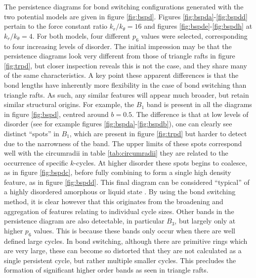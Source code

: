 The persistence diagrams for bond switching configurations generated with the two potential models are given in figure \ref{fig:bspd}.
Figures \ref{fig:bspda}\--\ref{fig:bspdd} pertain to the force constant ratio $k_r/k_\theta=16$ and figures \ref{fig:bspde}\--\ref{fig:bspdh} at $k_r/k_\theta=4$.
For both models, four different $p_6$ values were selected, corresponding to four increasing levels of disorder.
The initial impression may be that the persistence diagrams look very different from those of triangle rafts in figure \ref{fig:trpd}, but closer inspection reveals this is not the case, and they share many of the same characteristics.
A key point these apparent differences is that the bond lengths have inherently more flexibility in the case of bond switching than triangle rafts.
As such, any similar features will appear much broader, but retain similar structural origins.
For example, the $B_1$ band is present in all the diagrams in figure \ref{fig:bspd}, centred around $b=0.5$.
The difference is that at low levels of disorder  (see for example figures \ref{fig:bspda}\--\ref{fig:bspdb}), one can clearly see distinct ``spots'' in $B_1$, which are present in figure \ref{fig:trpd} but harder to detect due to the narrowness of the band.
The upper limits of these spots correspond well with the circumradii in table \ref{tab:circumradii} \ie{} they are related to the occurrence of specific $k$\--cycles.
At higher disorder these spots begins to coalesce, as in figure \ref{fig:bspdc}, before fully combining to form a single high density feature, as in figure \ref{fig:bspdd}.
This final diagram can be considered ``typical'' of a highly disordered amorphous or liquid state \cite{Hiraoka2016,Onodera2019}.
By using the bond switching method, it is clear however that this originates from the broadening and aggregation of features relating to individual cycle sizes.
Other bands in the persistence diagram are also detectable, in particular $B_3$, but largely only at higher $p_6$ values. 
This is because these bands only occur when there are well defined large cycles.
In bond switching, although there are primitive rings which are very large, these can become so distorted that they are not calculated as a single persistent cycle, but rather multiple smaller cycles.
This precludes the formation of significant higher order bands as seen in triangle rafts. 

